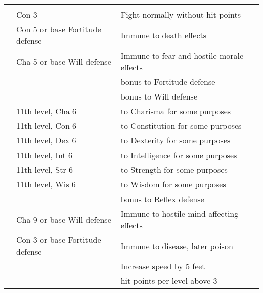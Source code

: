 {\small
{}
\begin{longtabu}{>{\lcol}p{10em} >{\lcol}p{15em} >{\lcol}X >{\lcol}p{3em}}
     &  &  &  \\
     & Con 3 & Fight normally without hit points &  \\
     & Con 5 or base Fortitude defense  & Immune to death effects &  \\
     & Cha 5 or base Will defense  & Immune to fear and hostile morale effects &  \\
     & \x &   bonus to Fortitude defense &  \\
     & \x &  bonus to Will defense &  \\
     & 11th level, Cha 6 &  to Charisma for some purposes &  \\
     & 11th level, Con 6 &  to Constitution for some purposes &  \\
     & 11th level, Dex 6 &  to Dexterity for some purposes &  \\
     & 11th level, Int 6 &  to Intelligence for some purposes &  \\
     & 11th level, Str 6 &  to Strength for some purposes &  \\
     & 11th level, Wis 6 &  to Wisdom for some purposes &  \\
     & \x &   bonus to Reflex defense &  \\
     & Cha 9 or base Will defense  & Immune to hostile mind-affecting effects &  \\
     & Con 3 or base Fortitude defense  & Immune to disease, later poison &  \\
     & \x & Increase speed by 5 feet &  \\
     & \x &   hit points  per level above 3 &  \\


\end{longtabu}}
